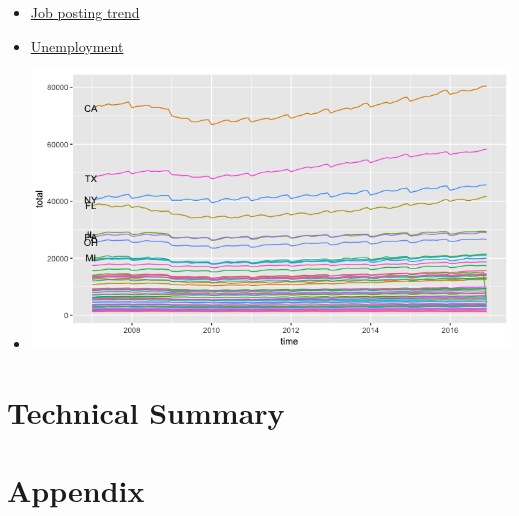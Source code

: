 \documentclass[11pt]{article}
\begin{document}
\begin{itemize}
\item \href{../postings/animated_choropleth.html}{Job posting trend}
\item \href{../ur/animated_choropleth.html}{Unemployment}
\item \includegraphics[width=.9\linewidth]{./employee_state.png}
\end{itemize}
\section{Technical Summary}
\label{sec-3}
\section{Appendix}
\label{sec-4}
\end{document}
